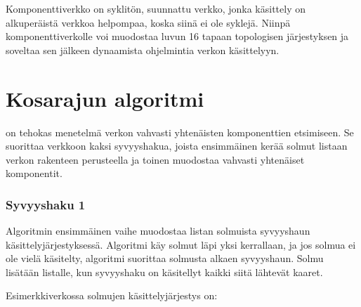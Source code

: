 Komponenttiverkko on syklitön, suunnattu verkko,
jonka käsittely on alkuperäistä verkkoa
helpompaa, koska siinä ei ole syklejä.
Niinpä komponenttiverkolle voi muodostaa
luvun 16 tapaan topologisen järjestyksen
ja soveltaa sen jälkeen dynaamista ohjelmintia
verkon käsittelyyn.

\section{Kosarajun algoritmi}


 on tehokas
menetelmä verkon
vahvasti yhtenäisten komponenttien etsimiseen.
Se suorittaa verkkoon
kaksi syvyyshakua, joista ensimmäinen
kerää solmut listaan verkon rakenteen perusteella
ja toinen muodostaa vahvasti yhtenäiset komponentit.

\subsubsection{Syvyyshaku 1}

Algoritmin ensimmäinen vaihe muodostaa listan solmuista
syvyyshaun käsittelyjärjestyksessä.
Algoritmi käy solmut läpi yksi kerrallaan,
ja jos solmua ei ole vielä käsitelty, algoritmi suorittaa
solmusta alkaen syvyyshaun.
Solmu lisätään listalle, kun syvyyshaku on 
käsitellyt kaikki siitä lähtevät kaaret.

Esimerkkiverkossa solmujen käsittelyjärjestys on:
\begin{center}
\end{center}

